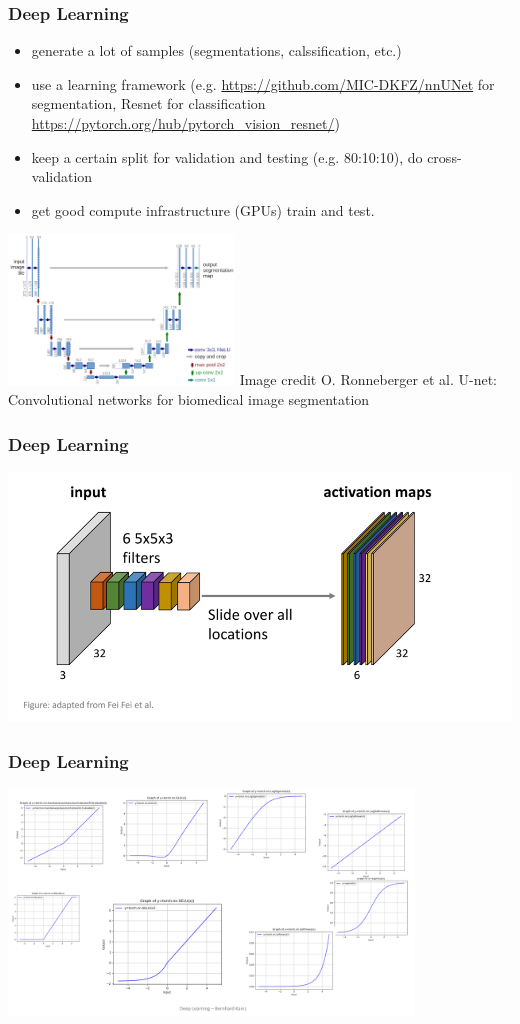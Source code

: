 \begin{frame}
    \frametitle{Deep Learning}
    \begin{itemize}
        \item generate a lot of samples (segmentations, calssification, etc.)
        \item use a learning framework (e.g. \url{https://github.com/MIC-DKFZ/nnUNet} for segmentation, Resnet for classification \url{https://pytorch.org/hub/pytorch_vision_resnet/})
        \item keep a certain split for validation and testing (e.g. 80:10:10), do cross-validation
        \item get good compute infrastructure (GPUs) train and test.
    \end{itemize}
    \begin{center}
 \includegraphics[height=4cm]{img/u-net-architecture.png}
{\tiny Image credit O. Ronneberger et al. U-net: Convolutional networks for biomedical image segmentation}
 \end{center}
\end{frame}

\begin{frame}
    \frametitle{Deep Learning}
    \includegraphics{img/convolution.png}
\end{frame}

\begin{frame}
    \frametitle{Deep Learning}
    \includegraphics[height=6cm]{img/activation.png}
\end{frame}


